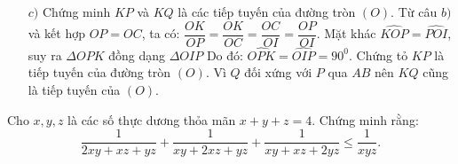 \begin{ex}
{\begin{enumerate}
			Ta có: $\widehat{{CIO}}=\widehat{{CIA}}=\widehat{{CHA}}=\widehat{{HAB}}+\widehat{{HBA}}$ (theo câu $a)$, và $\widehat{{CHA}}$ là góc ngoài của tam giác $\Delta HAB$).
			Do đó  $\widehat{{CIO}}=\widehat{{DAB}}+\widehat{{CBO}}=\widehat{{DCB}}+\widehat{{BCO}}=\widehat{{OCD}}=\widehat{{OCK}}$ (Vì $ABDC$ nội tiếp đường tròn $(O)$ và $OB=OC$).\hfill$(1)$\\
			Kết hợp $\widehat{{COI}}=\widehat{{KOC}}$.\hfill$(2)$\\
			Từ (1) và (2) suy ra $\Delta OCI$ đồng dạng $\Delta OKC$ (g.g).
			\item  [$c)$] Chứng minh $KP$ và $KQ$ là các tiếp tuyến của đường tròn $(O)$.
			Từ câu $b)$ và kết hợp $OP=OC$, ta có: $\dfrac{OK}{OP}=\dfrac{OK}{OC}=\dfrac{OC}{OI}=\dfrac{OP}{OI}$.
			Mặt khác $\widehat{{KOP}}=\widehat{{POI}}$, suy ra $\Delta OPK$ đồng dạng $\Delta OIP$
			Do đó: $\widehat{{OPK}}=\widehat{{OIP}}=90^0$. Chứng tỏ $KP$ là tiếp tuyến của đường tròn $(O)$.
			Vì $Q$ đối xứng với $P$ qua $AB$ nên $KQ$ cũng là tiếp tuyến của $(O)$.
		\end{enumerate}
}
\end{ex}
\begin{ex}%
Cho $x,y,z$ là các số thực dương thỏa mãn $x+y+z=4$. 
	Chứng minh rằng: $$\dfrac{1}{2xy+xz+yz}+\dfrac{1}{xy+2xz+yz}+\dfrac{1}{xy+xz+2yz}\leqslant \dfrac{1}{xyz}.$$
\end{ex}
